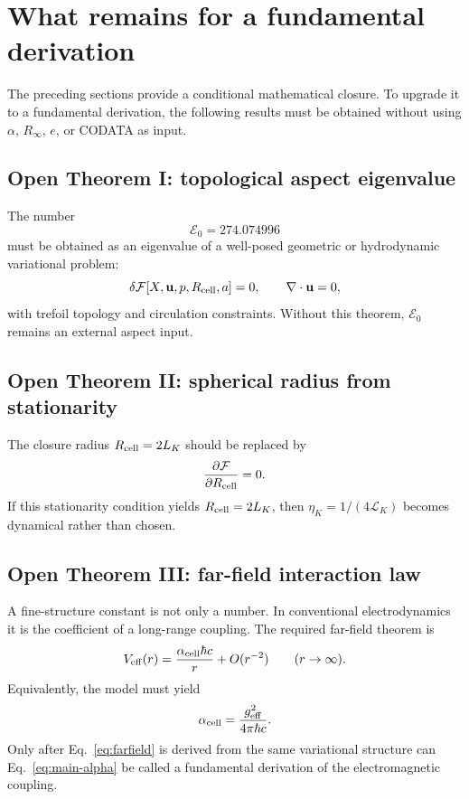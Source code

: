 \documentclass[11pt]{article}
\newcommand{\LK}{\mathcal L_K}
\newcommand{\Ezero}{\mathcal E_0}
\newcommand{\alphacell}{\alpha_{\rm cell}}
\begin{document}
\section{What remains for a fundamental derivation}
\label{sec:fundamental}

The preceding sections provide a conditional mathematical closure.  To upgrade it to a
fundamental derivation, the following results must be obtained without using \(\alpha\),
\(R_\infty\), \(e\), or CODATA as input.

\subsection{Open Theorem I: topological aspect eigenvalue}

The number
\begin{equation}
  \Ezero=274.074996
\end{equation}
must be obtained as an eigenvalue of a well-posed geometric or hydrodynamic variational
problem:
\begin{equation}
  \delta \mathcal F[X,\mathbf u,p,R_{\rm cell},a]=0,
  \qquad
  \nabla\cdot\mathbf u=0,
\end{equation}
with trefoil topology and circulation constraints.  Without this theorem, \(\Ezero\) remains
an external aspect input.

\subsection{Open Theorem II: spherical radius from stationarity}

The closure radius \(R_{\rm cell}=2L_K\) should be replaced by
\begin{equation}
  \frac{\partial \mathcal F}{\partial R_{\rm cell}}=0.
\end{equation}
If this stationarity condition yields \(R_{\rm cell}=2L_K\), then
\(\eta_K=1/(4\LK)\) becomes dynamical rather than chosen.

\subsection{Open Theorem III: far-field interaction law}

A fine-structure constant is not only a number.  In conventional electrodynamics it is the
coefficient of a long-range coupling.  The required far-field theorem is
\begin{equation}
  V_{\rm eff}(r)
  =
  \frac{\alphacell\hbar c}{r}
  +
  O(r^{-2})
  \qquad (r\to\infty).
  \label{eq:farfield}
\end{equation}
Equivalently, the model must yield
\begin{equation}
  \alphacell
  =
  \frac{g_{\rm eff}^2}{4\pi\hbar c}.
\end{equation}
Only after Eq.~\eqref{eq:farfield} is derived from the same variational structure can
Eq.~\eqref{eq:main-alpha} be called a fundamental derivation of the electromagnetic coupling.
\end{document}
